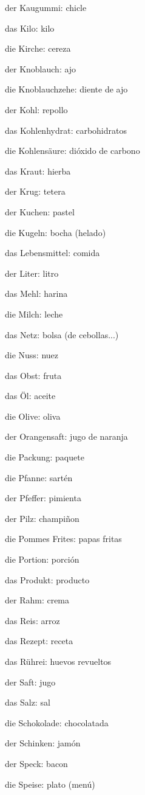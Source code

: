 \begin{multicols}{2}
\begin{myitemize}
\item der Kaugummi: chicle
\item das Kilo: kilo
\item die Kirche: cereza
\item der Knoblauch: ajo
\item die Knoblauchzehe: diente de ajo
\item der Kohl: repollo
\item das Kohlenhydrat: carbohidratos
\item die Kohlensäure: dióxido de carbono
\item das Kraut: hierba
\item der Krug: tetera
\item der Kuchen: pastel
\item die Kugeln: bocha (helado)
\item das Lebensmittel: comida
\item der Liter: litro
\item das Mehl: harina
\item die Milch: leche
\item das Netz: bolsa (de cebollas...)
\item die Nuss: nuez
\item das Obst: fruta
\item das Öl: aceite
\item die Olive: oliva
\item der Orangensaft: jugo de naranja
\item die Packung: paquete
\item die Pfanne: sartén
\item der Pfeffer: pimienta
\item der Pilz: champiñon
\item die Pommes Frites: papas fritas
\item die Portion: porción
\item das Produkt: producto
\item der Rahm: crema
\item das Reis: arroz
\item das Rezept: receta
\item das Rührei: huevos revueltos
\item der Saft: jugo
\item das Salz: sal
\item die Schokolade: chocolatada
\item der Schinken: jamón
\item der Speck: bacon
\item die Speise: plato (menú)

\end{myitemize}
\end{multicols}

